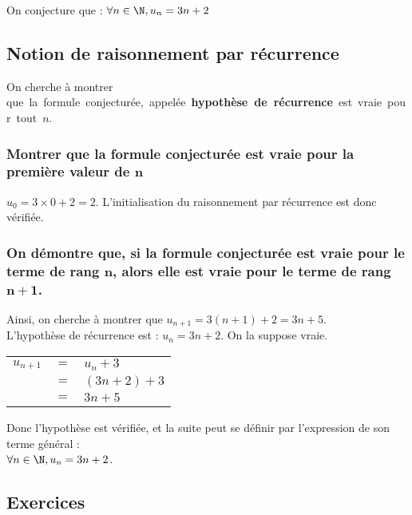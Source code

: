 \vspace*{.3cm}

On conjecture que : $\forall n \in \N, u_n = 3n + 2$

\subsection{Notion de raisonnement par récurrence}

On cherche à montrer \hbox{que la formule conjecturée, appelée \textbf{hypothèse de récurrence} est vraie pour tout $n$.}

\subsubsection{Montrer que la formule conjecturée est vraie pour la première valeur de $\mathbf{n}$}

$u_0 = 3 \times 0 + 2 = 2$. L'initialisation du raisonnement par récurrence est donc vérifiée. 

\subsubsection{On démontre que, si la formule conjecturée est vraie pour le terme de rang $\mathbf{n}$, alors elle est vraie pour le terme de rang $\mathbf{n + 1}$.}

Ainsi, on cherche à montrer que $u_{n+1} = 3\left(n+1\right) + 2 = 3n + 5$. \\

L'hypothèse de récurrence est : $u_n = 3n + 2$. On la suppose vraie. \\

\begin{tabular}{lll}
$u_{n+1}$ & $=$ & $u_n + 3$ \\
& $=$ & $\left(3n + 2\right) + 3$ \\
& $=$ & $3n + 5$ \\ 
\end{tabular}

\vspace*{.3cm}

Donc l'hypothèse est vérifiée, et la suite peut se définir par l'expression de son terme général  : \\ $\forall n \in \N, u_n = 3n + 2$.

\newpage

\vspace*{-2cm}

\subsection{Exercices}

